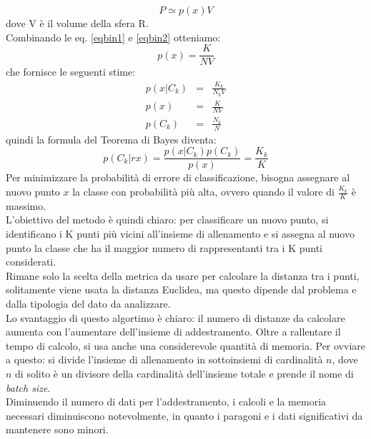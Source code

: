 \documentclass[a4paper,12pt]{report}
\begin{document}
\begin{equation} \label{eqbin2}
P\simeq p(x)V
\end{equation}
dove V \`{e} il volume della sfera R.\\
Combinando le eq. \ref{eqbin1} e \ref{eqbin2} otteniamo:
\begin{equation}
p(x)=\frac{K}{NV}
\end{equation}
che fornisce le seguenti stime:
\begin{eqnarray}
p(x|C_k)&=&\frac{K_k}{N_k V}\\
p(x)&=&\frac{K}{NV}\\
p(C_k)&=&\frac{N_k}{N}
\end{eqnarray}
quindi la formula del Teorema di Bayes diventa:%
\begin{equation}
p(C_k|r x)=\frac{p(x| C_k)p(C_k)}{p(x)}=\frac{K_k}{K}
\end{equation} 
Per minimizzare la probabilit\`{a} di errore di classificazione, bisogna assegnare al nuovo punto $x$ la classe con probabilit\`{a} pi\`{u} alta, ovvero quando il valore di $\frac{K_k}{K}$ \`{e} massimo.\\
L'obiettivo del metodo \`{e} quindi chiaro: per classificare un nuovo punto, si identificano i K punti pi\`{u} vicini all'insieme di allenamento e si assegna al nuovo punto la classe che ha il maggior numero di rappresentanti tra i K punti considerati.\\
Rimane solo la scelta della metrica da usare per calcolare la distanza tra i punti, solitamente viene usata la distanza Euclidea, ma questo dipende dal problema e dalla tipologia del dato da analizzare.\\
Lo svantaggio di questo algortimo \`{e} chiaro: il numero di distanze da calcolare aumenta con l'aumentare dell'insieme di addestramento. Oltre a rallentare il tempo di calcolo, si usa anche una considerevole quantit\`{a} di memoria. Per ovviare a questo: si divide l'insieme di allenamento in sottoinsiemi di cardinalit\`{a} $n$, dove $n$ di solito \`{e} un divisore della cardinalit\`{a} dell'insieme totale e prende il nome di \textit{batch size}.\\ Diminuendo il numero di dati per l'addestramento, i calcoli e la memoria necessari diminuiscono notevolmente, in quanto i paragoni e i dati significativi da mantenere sono minori.%
\end{document}
